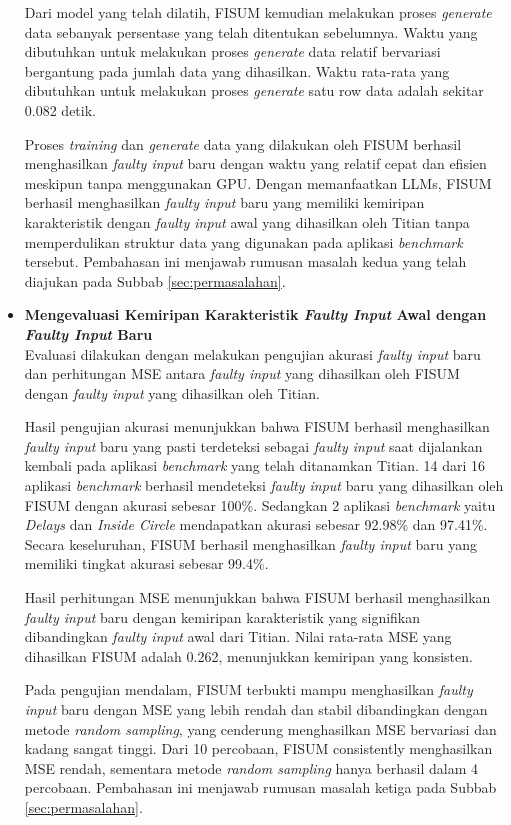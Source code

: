 \begin{itemize}
      Dari model yang telah dilatih, FISUM kemudian melakukan proses
      \emph{generate} data sebanyak persentase yang telah ditentukan
      sebelumnya. Waktu yang dibutuhkan untuk melakukan proses 
      \emph{generate} data relatif bervariasi bergantung pada jumlah
      data yang dihasilkan. Waktu rata-rata yang dibutuhkan untuk
      melakukan proses \emph{generate} satu row data adalah sekitar 0.082 detik.

      Proses \emph{training} dan \emph{generate} data yang dilakukan
      oleh FISUM berhasil menghasilkan \emph{faulty input} baru
      dengan waktu yang relatif cepat dan efisien meskipun tanpa menggunakan
      GPU. Dengan memanfaatkan LLMs, FISUM berhasil menghasilkan
      \emph{faulty input} baru yang memiliki kemiripan karakteristik
      dengan \emph{faulty input} awal yang dihasilkan oleh Titian 
      tanpa memperdulikan struktur data yang digunakan pada aplikasi
      \emph{benchmark} tersebut. Pembahasan ini menjawab rumusan masalah
      kedua yang telah diajukan pada Subbab \ref{sec:permasalahan}.
      
      \item \textbf{Mengevaluasi Kemiripan Karakteristik \emph{Faulty Input} Awal dengan \emph{Faulty Input} Baru}\\
      Evaluasi dilakukan dengan melakukan pengujian akurasi 
      \emph{faulty input} baru dan perhitungan MSE antara 
      \emph{faulty input} yang dihasilkan oleh FISUM dengan 
      \emph{faulty input} yang dihasilkan oleh Titian.
      
      Hasil pengujian akurasi menunjukkan bahwa FISUM berhasil
      menghasilkan \emph{faulty input} baru yang pasti terdeteksi
      sebagai \emph{faulty input} saat dijalankan kembali pada
      aplikasi \emph{benchmark} yang telah ditanamkan Titian.
      14 dari 16 aplikasi \emph{benchmark} berhasil mendeteksi
      \emph{faulty input} baru yang dihasilkan oleh FISUM dengan
      akurasi sebesar 100\%. Sedangkan 2 aplikasi \emph{benchmark}
      yaitu \emph{Delays} dan \emph{Inside Circle} mendapatkan
      akurasi sebesar 92.98\% dan 97.41\%. Secara keseluruhan, FISUM
      berhasil menghasilkan \emph{faulty input} baru yang memiliki
      tingkat akurasi sebesar 99.4\%. 

      Hasil perhitungan MSE menunjukkan bahwa FISUM berhasil menghasilkan \emph{faulty input} baru dengan kemiripan karakteristik yang signifikan dibandingkan \emph{faulty input} awal dari Titian. Nilai rata-rata MSE yang dihasilkan FISUM adalah 0.262, menunjukkan kemiripan yang konsisten.

      Pada pengujian mendalam, FISUM terbukti mampu menghasilkan \emph{faulty input} baru dengan MSE yang lebih rendah dan stabil dibandingkan dengan metode \emph{random sampling}, yang cenderung menghasilkan MSE bervariasi dan kadang sangat tinggi. Dari 10 percobaan, FISUM consistently menghasilkan MSE rendah, sementara metode \emph{random sampling} hanya berhasil dalam 4 percobaan. Pembahasan ini menjawab rumusan masalah ketiga pada Subbab \ref{sec:permasalahan}.



      
  
\end{itemize}

